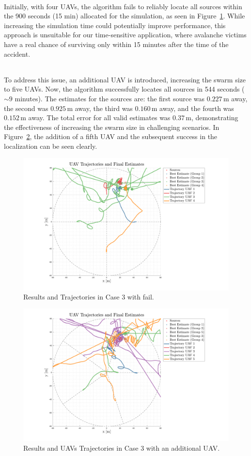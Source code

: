 \documentclass[main]{subfiles}
\begin{document}
\noindent\\
Initially, with four UAVs, the algorithm fails to reliably 
locate all sources within the 900 seconds (15 min) allocated for the simulation,
as seen in Figure~\ref{fig:case3fail}. 
While increasing the simulation time could potentially improve performance, 
this approach is unsuitable for our time-sensitive application, where
avalanche victims have a real chance of surviving only within 15 minutes
after the time of the accident.

\noindent\\
To address this issue, an additional UAV is introduced, increasing the 
swarm size to five UAVs. Now, the algorithm successfully 
locates all sources in 544 seconds (\(\sim 9\) minutes). 
The estimates for the sources are: the first source was \(0.227 \, \text{m}\) away, 
the second was \(0.925 \, \text{m}\) away, the third was \(0.160 \, \text{m}\) away, and the 
fourth was \(0.152 \, \text{m}\) away. The total error for all valid estimates was 
\(0.37 \, \text{m}\), demonstrating the effectiveness of increasing the 
swarm size in challenging scenarios.
In Figure~\ref{fig:case3}, the addition of a fifth UAV and the subsequent 
success in the localization can be seen clearly.

\begin{figure}
    \centering
    \includegraphics[width=1.06\textwidth]{images/case_3_fail.pdf}
    \caption[PSO Case 3]{Results and Trajectories in Case 3 with fail.}
    \label{fig:case3fail}
\end{figure}



\begin{figure}
    \centering
    \includegraphics[width=1.06\textwidth]{images/case_3.pdf}
    \caption[PSO Case 3]{Results and UAVs Trajectories in Case 3 with an additional UAV.}
    \label{fig:case3}
\end{figure}
\end{document}
